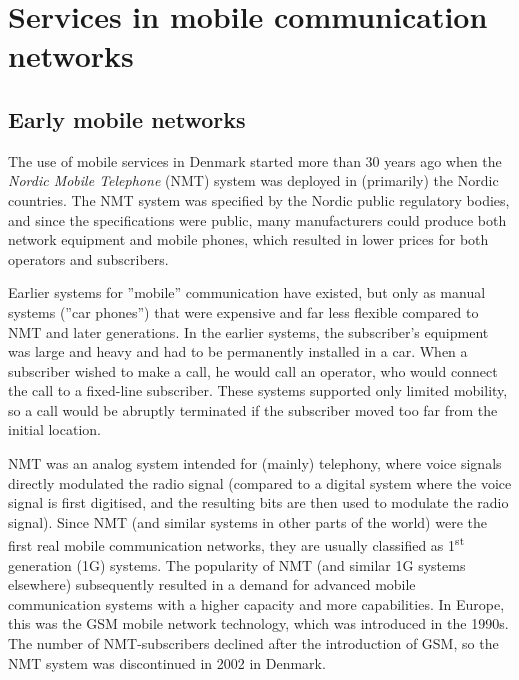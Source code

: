 \clearpage
\chapter{Services in mobile communication networks}
\label{sec:telenet_services}

\section{Early mobile networks}
The use of mobile services in Denmark started more than 30 years ago when the \emph{Nordic Mobile Telephone} (NMT) system was deployed in (primarily) the Nordic countries. The NMT system was specified by the Nordic public regulatory bodies, and since the specifications were public, many manufacturers could produce both network equipment and mobile phones, which resulted in lower prices for both operators and subscribers.

Earlier systems for ''mobile'' communication have existed, but only as manual systems (''car phones'') that were expensive and far less flexible compared to NMT and later generations. In the earlier systems, the subscriber's equipment was large and heavy and had to be permanently installed in a car. When a subscriber wished to make a call, he would call an operator, who would connect the call to a fixed-line subscriber. These systems supported only limited mobility, so a call would be abruptly terminated if the subscriber moved too far from the initial location.

NMT was an analog system intended for (mainly) telephony, where voice signals directly modulated the radio signal (compared to a digital system where the voice signal is first digitised, and the resulting bits are then used to  modulate the radio signal). Since NMT (and similar systems in other parts of the world) were the first real mobile communication networks, they are usually classified as 1\textsuperscript{st} generation (1G) systems. The popularity of NMT (and similar 1G systems elsewhere) subsequently resulted in a demand for advanced mobile communication systems with a higher capacity and more capabilities. In Europe, this was the GSM mobile network technology, which was introduced in the 1990s. The number of NMT-subscribers declined after the introduction of GSM, so the NMT system was discontinued in 2002 in Denmark.

